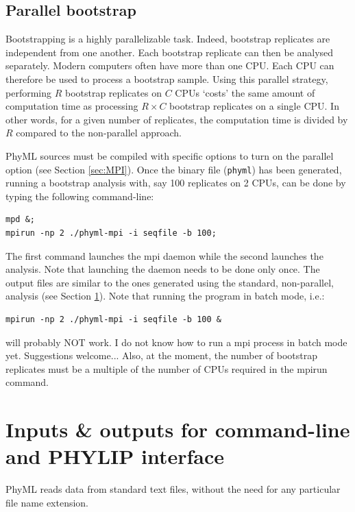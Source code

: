 \documentclass[a4paper,12pt]{article}
\newcommand{\x}[1]{\texttt{#1}}
\begin{document}
\subsection{Parallel  bootstrap}\label{sec:parallel_bootstrap}

Bootstrapping is  a highly  parallelizable task. Indeed,  bootstrap replicates are  independent from
one another.   Each bootstrap replicate can then  be analysed separately. Modern  computers often have
more than one CPU. Each CPU can therefore be used to process a bootstrap sample. Using this parallel
strategy, performing  $R$ bootstrap replicates  on $C$ CPUs  `costs' the same amount  of computation
time as processing $R  \times C$ bootstrap replicates on a single CPU.  In  other words, for a given
number of replicates, the computation time is divided by $R$ compared to the non-parallel approach.

PhyML sources  must be compiled with  specific options to turn  on the parallel  option (see Section
\ref{sec:MPI}). Once  the binary file (\x{phyml})  has been generated, running  a bootstrap analysis
with, say 100 replicates on 2 CPUs, can be done by typing the following command-line:
\begin{verbatim}
mpd &;
mpirun -np 2 ./phyml-mpi -i seqfile -b 100;
\end{verbatim}
The  first command  launches  the mpi  daemon  while the  second launches  the  analysis. Note  that
launching the daemon needs to be done only once.  The output files are similar to the ones generated
using the standard, non-parallel, analysis (see Section \ref{sec:input_output}). Note that running
the program in batch mode, i.e.:
\begin{verbatim}
mpirun -np 2 ./phyml-mpi -i seqfile -b 100 &
\end{verbatim}
will probably NOT work. I do not know how to run a mpi process in batch mode yet. Suggestions welcome...
Also, at the moment, the number of bootstrap replicates must be a multiple of the number of CPUs
required in the mpirun command.

\section{Inputs \& outputs for command-line and PHYLIP interface }\label{sec:input_output}

PhyML reads data from standard text files,  without the need for any particular file name extension.
\end{document}
